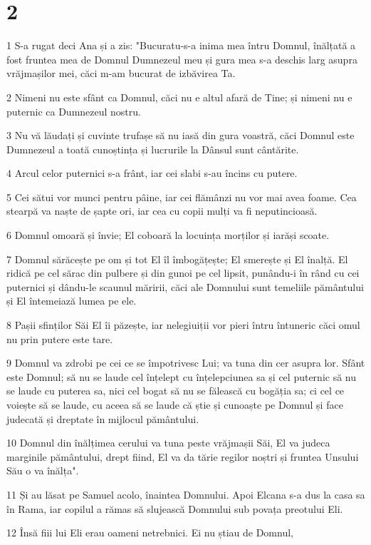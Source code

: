 \chapter{2}

\par 1 S-a rugat deci Ana și a zis: "Bucuratu-s-a inima mea întru Domnul, înălțată a fost fruntea mea de Domnul Dumnezeul meu și gura mea s-a deschis larg asupra vrăjmașilor mei, căci m-am bucurat de izbăvirea Ta.
\par 2 Nimeni nu este sfânt ca Domnul, căci nu e altul afară de Tine; și nimeni nu e puternic ca Dumnezeul nostru.
\par 3 Nu vă lăudați și cuvinte trufașe să nu iasă din gura voastră, căci Domnul este Dumnezeul a toată cunoștința și lucrurile la Dânsul sunt cântărite.
\par 4 Arcul celor puternici s-a frânt, iar cei slabi s-au încins cu putere.
\par 5 Cei sătui vor munci pentru pâine, iar cei flămânzi nu vor mai avea foame. Cea stearpă va naște de șapte ori, iar cea cu copii mulți va fi neputincioasă.
\par 6 Domnul omoară și învie; El coboară la locuința morților și iarăși scoate.
\par 7 Domnul sărăcește pe om și tot El îl îmbogățește; El smerește și El înalță. El ridică pe cel sărac din pulbere și din gunoi pe cel lipsit, punându-i în rând cu cei puternici și dându-le scaunul măririi, căci ale Domnului sunt temeliile pământului și El întemeiază lumea pe ele.
\par 8 Pașii sfinților Săi El îi păzește, iar nelegiuiții vor pieri întru întuneric căci omul nu prin putere este tare.
\par 9 Domnul va zdrobi pe cei ce se împotrivesc Lui; va tuna din cer asupra lor. Sfânt este Domnul; să nu se laude cel înțelept cu înțelepciunea sa și cel puternic să nu se laude cu puterea sa, nici cel bogat să nu se fălească cu bogăția sa; ci cel ce voiește să se laude, cu aceea să se laude că știe și cunoaște pe Domnul și face judecată și dreptate în mijlocul pământului.
\par 10 Domnul din înălțimea cerului va tuna peste vrăjmașii Săi, El va judeca marginile pământului, drept fiind, El va da tărie regilor noștri și fruntea Unsului Său o va înălța".
\par 11 Și au lăsat pe Samuel acolo, înaintea Domnului. Apoi Elcana s-a dus la casa sa în Rama, iar copilul a rămas să slujească Domnului sub povața preotului Eli.
\par 12 Însă fiii lui Eli erau oameni netrebnici. Ei nu știau de Domnul,

